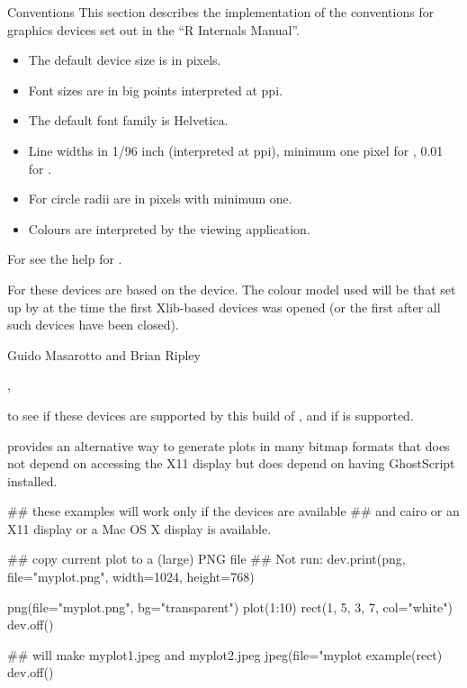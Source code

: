 \begin{Section}{Conventions}
This section describes the implementation of the conventions for
graphics devices set out in the ``R Internals Manual''.

\begin{itemize}

\item The default device size is in pixels.
\item Font sizes are in big points interpreted at  ppi.
\item The default font family is Helvetica.
\item Line widths in 1/96 inch (interpreted at  ppi),
minimum one pixel for , 0.01 for .
\item For  circle radii are in pixels with
minimum one.
\item Colours are interpreted by the viewing application.

\end{itemize}


For  see the help for .
\end{Section}
%
\begin{Note}\relax
For  these devices are based on the 
device.  The colour model used will be that set up by
 at the time the first Xlib-based devices was opened
(or the first after all such devices have been closed).
\end{Note}
%
\begin{Author}\relax
Guido Masarotto and Brian Ripley
\end{Author}
%
\begin{SeeAlso}\relax
{}, 

 to see if these devices are
supported by this build of \R{}, and if  is supported.

 provides an alternative way to generate plots in many
bitmap formats that does not depend on accessing the X11 display but does
depend on having GhostScript installed.
\end{SeeAlso}
%
\begin{Examples}
\begin{ExampleCode}
## these examples will work only if the devices are available
## and cairo or an X11 display or a Mac OS X display is available.

## copy current plot to a (large) PNG file
## Not run: dev.print(png, file="myplot.png", width=1024, height=768)

png(file="myplot.png", bg="transparent")
plot(1:10)
rect(1, 5, 3, 7, col="white")
dev.off()

## will make myplot1.jpeg and myplot2.jpeg
jpeg(file="myplot%
example(rect)
dev.off()
\end{ExampleCode}
\end{Examples}

